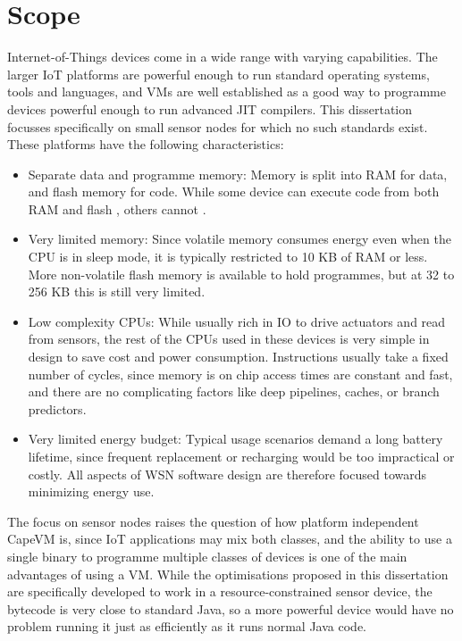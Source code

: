 \section{Scope}
\label{sec-introduction-scope}
Internet-of-Things devices come in a wide range with varying capabilities. The larger IoT platforms are powerful enough to run standard operating systems, tools and languages, and VMs are well established as a good way to programme devices powerful enough to run advanced JIT compilers. This dissertation focusses specifically on small sensor nodes for which no such standards exist. These platforms have the following characteristics:
\begin{itemize}
    \item Separate data and programme memory: Memory is split into RAM for data, and flash memory for code. While some device can execute code from both RAM and flash \cite{TexasInstrumentsIncorporated:MSP430F1611Datasheet}, others cannot \cite{Atmel:ATmega128Datasheet}.
    \item Very limited memory: Since volatile memory consumes energy even when the CPU is in sleep mode, it is typically restricted to 10 KB of RAM or less. More non-volatile flash memory is available to hold programmes, but at 32 to 256 KB this is still very limited.
    \item Low complexity CPUs: While usually rich in IO to drive actuators and read from sensors, the rest of the CPUs used in these devices is very simple in design to save cost and power consumption. Instructions usually take a fixed number of cycles, since memory is on chip access times are constant and fast, and there are no complicating factors like deep pipelines, caches, or branch predictors.
    \item Very limited energy budget: Typical usage scenarios demand a long battery lifetime, since frequent replacement or recharging would be too impractical or costly. All aspects of WSN software design are therefore focused towards minimizing energy use.
\end{itemize}

The focus on sensor nodes raises the question of how platform independent CapeVM is, since IoT applications may mix both classes, and the ability to use a single binary to programme multiple classes of devices is one of the main advantages of using a VM. While the optimisations proposed in this dissertation are specifically developed to work in a resource-constrained sensor device, the bytecode is very close to standard Java, so a more powerful device would have no problem running it just as efficiently as it runs normal Java code.

